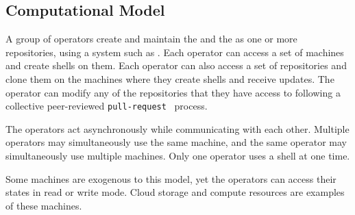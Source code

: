 \subsection{Computational Model}\label{computation_model}

A group of operators create and maintain the  and the  as one or more repositories, using a system such as . Each operator can access a set of machines and create shells on them. Each operator can also access a set of repositories and clone them on the machines where they create shells and receive updates. The operator can modify any of the repositories that they have access to following a collective peer-reviewed \texttt{pull-request}~\cite{pull_request} process.

The operators act asynchronously while communicating with each other. Multiple operators may simultaneously use the same machine, and the same operator may simultaneously use multiple machines. Only one operator uses a shell at one time. 

Some machines are exogenous to this model, yet the operators can access their states in read or write mode. Cloud storage and compute resources are examples of these machines.